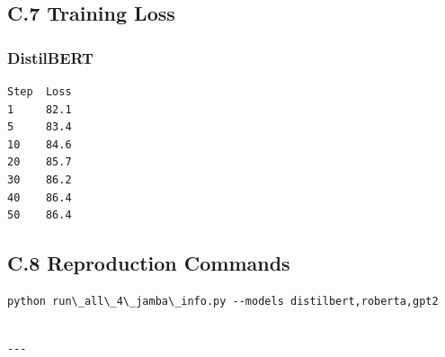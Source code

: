 \subsection{C.7 Training Loss}

\subsubsection{DistilBERT}
\begin{lstlisting}
Step  Loss
1     82.1
5     83.4
10    84.6
20    85.7
30    86.2
40    86.4
50    86.4
\end{lstlisting}

\subsection{C.8 Reproduction Commands}

\begin{lstlisting}
python run\_all\_4\_jamba\_info.py --models distilbert,roberta,gpt2
\end{lstlisting}
\begin{lstlisting}

---
\end{lstlisting}